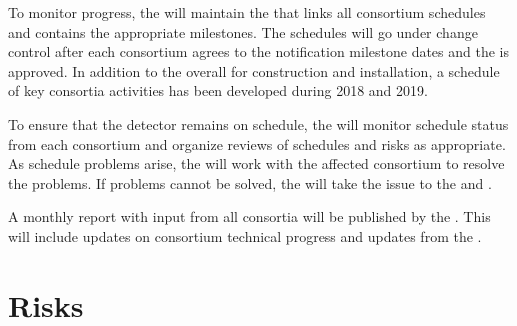 To monitor progress, the  will maintain the  that links all consortium schedules
and contains the appropriate milestones.
The schedules will go under change control after each
consortium agrees to the notification milestone dates and the  is
approved.
In addition to the overall  for construction and
installation, a schedule of key consortia activities has been developed during
2018 and 2019.

To ensure that the  detector remains on schedule, the
 will monitor schedule status from each consortium and organize
reviews of schedules and risks as appropriate.  As schedule problems
arise, the  will work with the affected consortium to resolve the
problems. If problems cannot be solved, the  will take the issue to the
 and .

A monthly report with input from all consortia will be published by the
. This will include updates on consortium technical progress and
updates from the .

\section{Risks}
\label{sec:fdsp-coord-risks}

